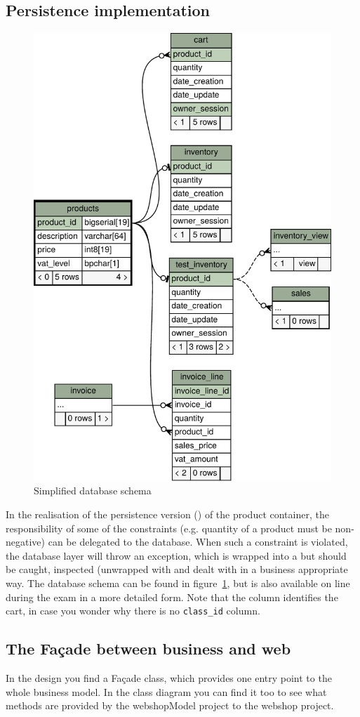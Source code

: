 \subsection{Persistence implementation}
\begin{figure}\vspace{-2\baselineskip}  
  \includegraphics[width=.45\textwidth]{figures/products_implied2degrees.pdf}%
  \caption{\label{dbschema}Simplified database schema}
\end{figure}%
In the realisation of the persistence version 
() of the product 
container, the responsibility of some of the constraints
(e.g. quantity of a product must be non-negative) can be delegated to
the database. When such a constraint is violated, the database layer
will throw an exception, which is wrapped into a  
but should be caught, inspected (unwrapped with  
and dealt with in a business appropriate way. 
The database schema can be found in figure~\ref{dbschema}, 
but is also available on line during the exam in a more detailed form.
Note that the  column identifies the cart, in case you
wonder why there is no \texttt{class\_id} column.

\subsection{The Façade between business and web}
In the design you find a Façade class, which provides one entry point to the
whole business model. In the class diagram you can find it too to see
what methods are provided by the webshopModel project to the webshop project.



